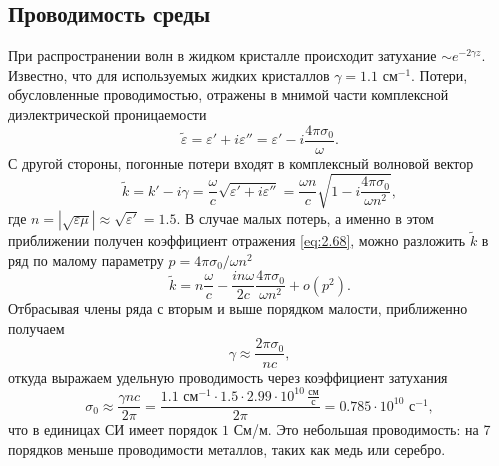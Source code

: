 \documentclass[a4paper,14pt]{extarticle}
\begin{document}
\subsection{Проводимость среды}
При распространении волн в жидком кристалле происходит затухание $\sim e^{-2\gamma z}$. Известно, что для используемых жидких кристаллов $\gamma = 1.1$ см$^{-1}$. Потери, обусловленные проводимостью, отражены в  мнимой части комплексной диэлектрической проницаемости
\begin{equation}
	\tilde{\varepsilon} = \varepsilon' + i \varepsilon'' = \varepsilon' - i \frac{4\pi \sigma_0}{\omega}.
\end{equation}
С другой стороны, погонные потери входят в комплексный волновой вектор
\begin{equation}
	\tilde{k} = k' - i\gamma = \frac{\omega}{c}\sqrt{\varepsilon' + i \varepsilon''} = \frac{\omega n}{c}\sqrt{1-i\frac{4\pi \sigma_0}{\omega n^2}},
\end{equation}
где $n = |\sqrt{\varepsilon\mu}| \approx \sqrt{\varepsilon'} = 1.5$. В случае малых потерь, а именно в этом приближении получен коэффициент отражения \eqref{eq:2.68}, можно разложить $\tilde{k}$ в ряд по малому параметру $p=4\pi\sigma_0 / \omega n^2$
\begin{equation}
	\tilde{k} = n\frac{\omega}{c} - \frac{i n\omega}{2c} \frac{4\pi \sigma_0}{\omega n^2} + o(p^2).
\end{equation}
Отбрасывая члены ряда с вторым и выше порядком малости, приближенно получаем
\begin{equation}
	\gamma \approx \frac{2\pi \sigma_0}{nc},
\end{equation}
откуда выражаем удельную проводимость через коэффициент затухания
\begin{equation}
	\sigma_0 \approx \frac{\gamma n c}{2\pi} = \frac{1.1\text{ см}^{-1} \cdot 1.5 \cdot 2.99\cdot 10^{10}\, \frac{\text{см}}{\text{с}}}{2\pi} = 0.785\cdot 10^{10} \text{ с}^{-1},
\end{equation}
что в единицах СИ имеет порядок $1$ См/м. Это небольшая проводимость: на 7 порядков меньше проводимости металлов, таких как медь или серебро. 
\end{document}
